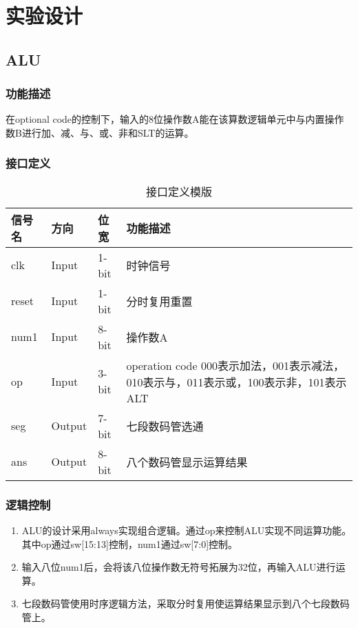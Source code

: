 \section{实验设计}

\subsection{ALU}\label{sub:alu}

\subsubsection{功能描述}
{在optional code的控制下，输入的8位操作数A能在该算数逻辑单元中与内置操作数B进行加、减、与、或、非和SLT的运算。}

\subsubsection{接口定义}
\begin{table}[htp]
\caption{接口定义模版}
\begin{center}
	\begin{tabular}{lllp{6cm}}
	\hline
	\textbf{信号名} & \textbf{方向} & \textbf{位宽} & \textbf{功能描述}\\ \hline
	clk & Input & 1-bit & 时钟信号 \\
	reset & Input & 1-bit & 分时复用重置 \\
	num1 & Input & 8-bit & 操作数A \\
	op & Input & 3-bit & operation code 000表示加法，001表示减法，010表示与，011表示或，100表示非，101表示ALT\\
	seg & Output & 7-bit & 七段数码管选通 \\
	ans & Output & 8-bit & 八个数码管显示运算结果 \\
	\hline
	\end{tabular}
\end{center}
\end{table}

\subsubsection{逻辑控制}{\begin{enumerate}
\item ALU的设计采用always实现组合逻辑。通过op来控制ALU实现不同运算功能。
其中op通过sw[15:13]控制，num1通过sw[7:0]控制。
\item 输入八位num1后，会将该八位操作数无符号拓展为32位，再输入ALU进行运算。
\item 七段数码管使用时序逻辑方法，采取分时复用使运算结果显示到八个七段数码管上。
\end{enumerate}}
